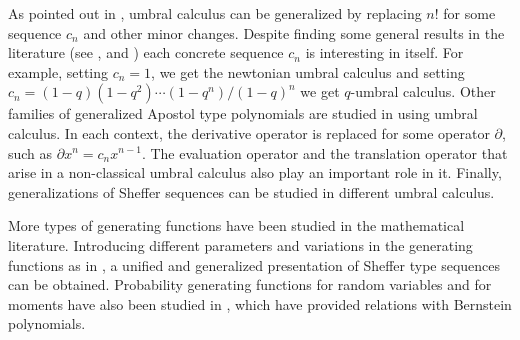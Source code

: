 \documentclass[11pt]{article}
\theoremstyle{plain}
\theoremstyle{remark}
\numberwithin{equation}{section} %
\begin{document}
As pointed out in \cite[Chapter 6]{Rom}, umbral calculus can be generalized by replacing $n!$ for some sequence $c_n$ and other minor changes. Despite finding some general results in the literature (see \cite{RomV1}, \cite{RomV2} and \cite{RomV3}) each concrete sequence $c_n$ is interesting in itself. For example, setting $c_n=1$, we get the newtonian umbral calculus and setting $c_n = (1-q)(1-q^2)\cdots(1-q^n)/(1-q)^n$ we get $q$-umbral calculus. Other families of generalized Apostol type polynomials are studied in \cite{DeSimSri} using umbral calculus. In each context, the derivative operator is replaced for some operator $\partial$, such as $\partial x^n = c_n x^{n-1}$. The evaluation operator and the translation operator that arise in a non-classical umbral calculus also play an important role in it. Finally, generalizations of Sheffer sequences can be studied in different umbral calculus.

More types of generating functions have been studied in the mathematical literature. Introducing different parameters and variations in the generating functions as in \cite{Kilar-Simsek, Kuc, KucSim, OzSim}, a unified and generalized presentation of Sheffer type sequences can be obtained. Probability generating functions for random variables and for moments have also been studied in \cite{Sim}, which have provided relations with Bernstein polynomials.
\end{document}
